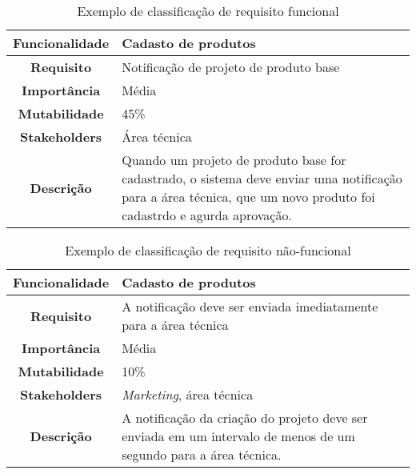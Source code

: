       \begin{table}[h!]
        \centering
        \begin{tabular}{|c|p{10cm}|}
          \hline
          \textbf{Funcionalidade} &
          Cadasto de produtos \\ \hline
          \textbf{Requisito} &
          Notificação de projeto de produto base \\ \hline
          \textbf{Importância} &
          Média \\ \hline
          \textbf{Mutabilidade} &
          45\% \\ \hline
          \textbf{Stakeholders} &
          Área técnica \\ \hline
          \textbf{Descrição} &
          Quando um projeto de produto base for cadastrado, o sistema deve
          enviar uma notificação para a área técnica, que um novo produto
          foi cadastrdo e agurda aprovação. \\ \hline
        \end{tabular}
        \caption{Exemplo de classificação de requisito funcional}
        \label{Tabela:5}
      \end{table}

      \begin{table}[h!]
        \centering
        \begin{tabular}{|c|p{10cm}|}
          \hline
          \textbf{Funcionalidade} &
          Cadasto de produtos \\ \hline
          \textbf{Requisito} &
          A notificação deve ser enviada imediatamente para a área técnica \\ \hline
          \textbf{Importância} &
          Média \\ \hline
          \textbf{Mutabilidade} &
          10\% \\ \hline
          \textbf{Stakeholders} &
          \textit{Marketing}, área técnica \\ \hline
          \textbf{Descrição} &
          A notificação da criação do projeto deve ser enviada em um intervalo de
          menos de um segundo para a área técnica. \\ \hline
        \end{tabular}
        \caption{Exemplo de classificação de requisito não-funcional}
        \label{Tabela:6}
      \end{table}

